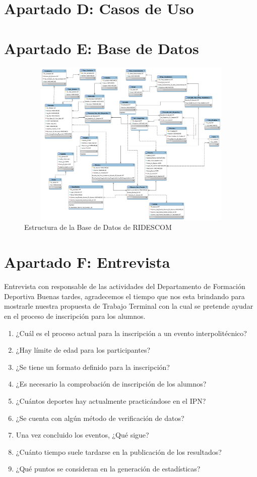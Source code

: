 	\section{Apartado D: Casos de Uso}
		\label{CasosdeUso}
		
		
		
		
		
		
	
	\section{Apartado E: Base de Datos}
		\label{BasedeDatos}
		\begin{figure}[hbt!]
			\centering
			\includegraphics[width=16cm, height=8cm]{Imagenes/Disenos/BasedeDatos.png}
			\caption{Estructura de la Base de Datos de RIDESCOM}
			\label{BaseDatos}
		\end{figure}
	
	\section{Apartado F: Entrevista}
		Entrevista con responsable de las actividades del Departamento de Formación Deportiva
		Buenas tardes, agradecemos el tiempo que nos esta brindando para mostrarle nuestra propuesta de Trabajo Terminal con la cual se pretende ayudar en el proceso de inscripción para los alumnos.
		\label{Entrevista}
		\begin{enumerate}
			\item ¿Cuál es el proceso actual para la inscripción a un evento interpolitécnico?
			\item ¿Hay límite de edad para los participantes?
			\item ¿Se tiene un formato definido para la inscripción?
			\item ¿Es necesario la comprobación de inscripción de los alumnos?
			\item ¿Cuántos deportes hay actualmente practicándose en el IPN?
			\item ¿Se cuenta con algún método de verificación de datos?
			\item Una vez concluido los eventos, ¿Qué sigue?
			\item ¿Cuánto tiempo suele tardarse en la publicación de los resultados?
			\item ¿Qué puntos se consideran en la generación de estadísticas?
		\end{enumerate} 
